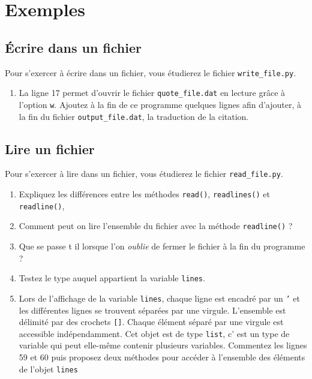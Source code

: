 \section{Exemples}

\subsection{Écrire dans un fichier}

Pour s'exercer à écrire dans un fichier, vous étudierez le fichier \texttt{write\_file.py}.

\begin{enumerate}

\item La ligne 17 permet d'ouvrir le fichier \texttt{quote\_file.dat} en lecture grâce
  à l'option \texttt{w}.
  Ajoutez à la fin de ce programme quelques lignes afin d'ajouter, à la fin du
  fichier \texttt{output\_file.dat}, la traduction de la citation.

\end{enumerate}

\subsection{Lire un fichier}

Pour s'exercer à lire dans un fichier, vous étudierez le fichier \texttt{read\_file.py}.

\begin{enumerate}

\item Expliquez les différences entre les méthodes \texttt{read()},
  \texttt{readlines()} et \texttt{readline()},

\item Comment peut on lire l'ensemble du fichier avec la méthode \texttt{readline()} ?

\item Que se passe t il lorsque l'on \textit{oublie} de fermer le fichier à la fin du programme ?

\item Testez le type auquel appartient la variable \texttt{lines}.

\item Lors de l'affichage de la variable \texttt{lines}, chaque ligne est encadré par un \texttt{'} et
  les différentes lignes se trouvent séparées par une virgule. L'ensemble est délimité par des crochets \texttt{[]}.
  Chaque élément séparé par une virgule est accessible indépendamment.
  Cet objet est de type \texttt{list}, c' est un type de variable qui peut elle-même contenir plusieurs variables.
  Commentez les lignes 59 et 60 puis proposez deux méthodes pour accéder à l'ensemble des éléments de l'objet \texttt{lines}

\end{enumerate}

